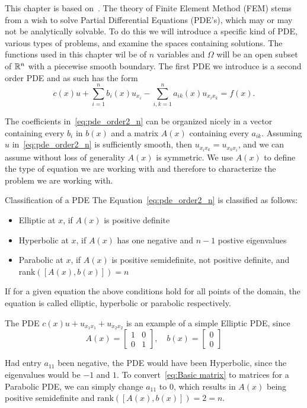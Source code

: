 This chapter is based on~\cite{Braess}.
The theory of Finite Element Method (FEM) stems from a 
wish to solve Partial Differential Equations (PDE's),
which may or may not be analytically solvable. 
To do this we will introduce a specific kind of PDE, 
various types of 
problems, and examine the spaces containing solutions. 
The functions used in this chapter wil be of $n$ 
variables and $\Omega$ will be 
an open subset of $\mathbb{R}^n$ with a piecewise smooth boundary.
The first PDE we introduce is a second order PDE and as 
such has the form
\begin{equation}
	 c(x) u + \sum_{i=1}^{n}b_i(x)u_{x_{i}}
	- \sum_{i,k=1}^{n}a_{ik}(x)u_{x_i x_k}\label{eq:pde_order2_n}
	= f(x).
\end{equation}

The coefficients in~\eqref{eq:pde_order2_n} can be 
organized nicely in a vector containing every $b_i$ 
in $b(x)$
and a matrix $A(x)$ containing every $a_{ik}$.
Assuming $u$ in~\eqref{eq:pde_order2_n} is sufficiently 
smooth, then $u_{x_i x_k} =u_{x_k x_i} $, and we can 
assume without loss of generality $A(x)$ is 
symmetric. %
We use $A(x)$ to define the type of equation we are working 
with and therefore to characterize the problem we are 
working with.
\begin{defn}{Classification of a PDE}
	The Equation~\eqref{eq:pde_order2_n} is classified as follows:
	\begin{itemize}
		\item Elliptic at $x$, if $A(x)$ is positive definite
		\item Hyperbolic at $x$, if $A(x)$ has one negative and $n-1$ postive eigenvalues
		\item Parabolic at $x$, if $A(x)$ is positive semidefinite, not positive definite, and rank$([A(x), b(x)])=n$
	\end{itemize}
	If for a given equation the above conditions hold for all points of the domain, the equation is called elliptic, hyperbolic or parabolic respectively.\label{def:pde_classification}
\end{defn}


\begin{exmp}{\quad}
The PDE $c(x)u + u_{x_1x_1} + u_{x_2x_2}$ is an example of a simple Elliptic PDE, since
\begin{equation}\label{eq:Basic matrix}
	A(x) = \begin{bmatrix}
		1 & 0\\
		0 & 1
	\end{bmatrix}, \quad
	b(x) = \begin{bmatrix}
		0\\
		0
	\end{bmatrix}
\end{equation}

Had entry $a_{11}$ been negative, the PDE would have been Hyperbolic, since the eigenvalues would be $-1$ and $1$. To convert~\eqref{eq:Basic matrix} to matrices for a Parabolic PDE, we can simply change $a_{11}$ to $0$, which results in $A(x)$ being positive semidefinite and $\text{rank}([A(x), b(x)]) = 2 = n$.
\end{exmp}
	

